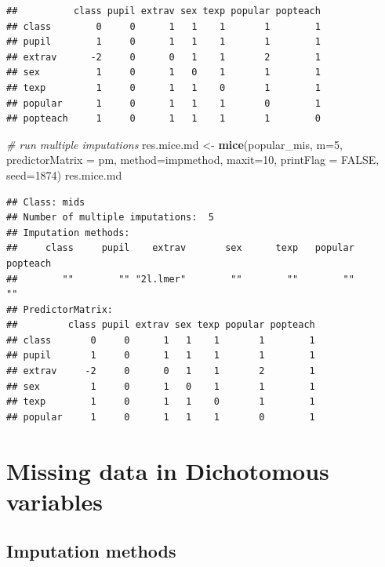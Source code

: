 \documentclass[
]{book}
\newenvironment{Shaded}{\begin{snugshade}}{\end{snugshade}}
\newcommand{\CommentTok}[1]{\textcolor[rgb]{0.56,0.35,0.01}{\textit{#1}}}
\newcommand{\DataTypeTok}[1]{\textcolor[rgb]{0.13,0.29,0.53}{#1}}
\newcommand{\DecValTok}[1]{\textcolor[rgb]{0.00,0.00,0.81}{#1}}
\newcommand{\KeywordTok}[1]{\textcolor[rgb]{0.13,0.29,0.53}{\textbf{#1}}}
\newcommand{\NormalTok}[1]{#1}
\newcommand{\OtherTok}[1]{\textcolor[rgb]{0.56,0.35,0.01}{#1}}
\newcommand{\StringTok}[1]{\textcolor[rgb]{0.31,0.60,0.02}{#1}}
\begin{document}
\begin{verbatim}
##          class pupil extrav sex texp popular popteach
## class        0     0      1   1    1       1        1
## pupil        1     0      1   1    1       1        1
## extrav      -2     0      0   1    1       2        1
## sex          1     0      1   0    1       1        1
## texp         1     0      1   1    0       1        1
## popular      1     0      1   1    1       0        1
## popteach     1     0      1   1    1       1        0
\end{verbatim}

\begin{Shaded}
\begin{Highlighting}[]
\CommentTok{# run multiple imputations}
\NormalTok{res.mice.md <-}\StringTok{ }\KeywordTok{mice}\NormalTok{(popular_mis, }\DataTypeTok{m=}\DecValTok{5}\NormalTok{, }\DataTypeTok{predictorMatrix =}\NormalTok{ pm,}
                    \DataTypeTok{method=}\NormalTok{impmethod, }\DataTypeTok{maxit=}\DecValTok{10}\NormalTok{, }\DataTypeTok{printFlag =} \OtherTok{FALSE}\NormalTok{, }\DataTypeTok{seed=}\DecValTok{1874}\NormalTok{)}
\NormalTok{res.mice.md}
\end{Highlighting}
\end{Shaded}

\begin{verbatim}
## Class: mids
## Number of multiple imputations:  5 
## Imputation methods:
##     class     pupil    extrav       sex      texp   popular  popteach 
##        ""        "" "2l.lmer"        ""        ""        ""        "" 
## PredictorMatrix:
##         class pupil extrav sex texp popular popteach
## class       0     0      1   1    1       1        1
## pupil       1     0      1   1    1       1        1
## extrav     -2     0      0   1    1       2        1
## sex         1     0      1   0    1       1        1
## texp        1     0      1   1    0       1        1
## popular     1     0      1   1    1       0        1
\end{verbatim}

\hypertarget{missing-data-in-dichotomous-variables}{%
\section{Missing data in Dichotomous
variables}\label{missing-data-in-dichotomous-variables}}

\hypertarget{imputation-methods-1}{%
\subsection{Imputation methods}\label{imputation-methods-1}}
\end{document}
